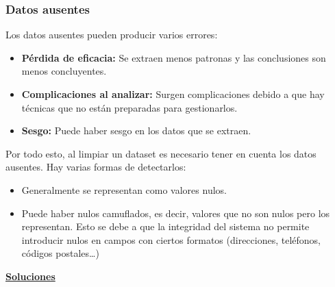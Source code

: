 \documentclass[12pt, letterpaper]{article}
\begin{document}
\subsubsection{Datos ausentes}
Los datos ausentes pueden producir varios errores:
\begin{itemize}
    \item \textbf{Pérdida de eficacia:} Se extraen menos patronas y las conclusiones son menos concluyentes.
    \item \textbf{Complicaciones al analizar:} Surgen complicaciones debido a que hay técnicas que no están preparadas para gestionarlos.
    \item \textbf{Sesgo:} Puede haber sesgo en los datos que se extraen.
\end{itemize}

Por todo esto, al limpiar un dataset es necesario tener en cuenta los datos ausentes. Hay varias formas de detectarlos:
\begin{itemize}
    \item Generalmente se representan como valores nulos.
    \item Puede haber nulos camuflados, es decir, valores que no son nulos pero los representan. Esto se debe a que la integridad del sistema no permite introducir nulos en campos con ciertos formatos (direcciones, teléfonos, códigos postales\ldots)
\end{itemize}

\vspace{1em}
\underline{\textbf{Soluciones}}
\vspace{1em}
\end{document}
